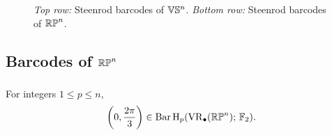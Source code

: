 \begin{figure}
	\centering
	
	\caption{\emph{Top row:} Steenrod barcodes of $\mathbb{V}\mathbb{S}^n$. \emph{Bottom row:} Steenrod barcodes of $\mathbb{RP}^n$.}
	\label{fig:sq barcodes}
\end{figure}

\subsection{Barcodes of $\mathbb{RP}^n$}

\subsubsection{}\label{prop:RPn bar}
\lemma For integers $1 \leq p \leq n$,
\[
\left(0, \frac{2\pi}{3}\right) \in \operatorname{Bar} \operatorname{H}_{p}(\operatorname{VR}_\bullet(\mathbb{RP}^n);\,{\mathbb{F}_2}).
\]

